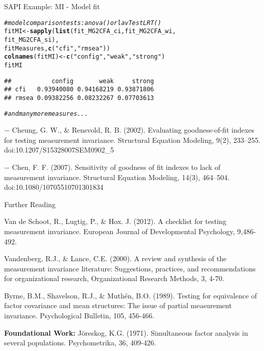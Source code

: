 \documentclass[10pt]{beamer}\usepackage[]{graphicx}\usepackage[]{xcolor}
\makeatletter
\newcommand{\hlsng}[1]{\textcolor[rgb]{0.192,0.494,0.8}{#1}}%
\newcommand{\hlcom}[1]{\textcolor[rgb]{0.678,0.584,0.686}{\textit{#1}}}%
\newcommand{\hldef}[1]{\textcolor[rgb]{0.345,0.345,0.345}{#1}}%
\newcommand{\hlkwb}[1]{\textcolor[rgb]{0.69,0.353,0.396}{#1}}%
\newcommand{\hlkwd}[1]{\textcolor[rgb]{0.737,0.353,0.396}{\textbf{#1}}}%
\newenvironment{kframe}{%
 \def\at@end@of@kframe{}%
 \ifinner\ifhmode%
  \def\at@end@of@kframe{\end{minipage}}%
  \begin{minipage}{\columnwidth}%
 \fi\fi%
 \def\FrameCommand##1{\hskip\@totalleftmargin \hskip-\fboxsep
 \colorbox{shadecolor}{##1}\hskip-\fboxsep
     \hskip-\linewidth \hskip-\@totalleftmargin \hskip\columnwidth}%
 \MakeFramed {\advance\hsize-\width
   \@totalleftmargin\z@ \linewidth\hsize
   \@setminipage}}%
 {\par\unskip\endMakeFramed%
 \at@end@of@kframe}
\newenvironment{knitrout}{}{} %
\makeatother
\begin{document}
\begin{frame}[fragile]{SAPI Example: MI - Model fit}

\begin{knitrout}
\color{fgcolor}\begin{kframe}
\begin{alltt}
\hlcom{# model comparison tests: anova() or lavTestLRT()}
\hldef{fitMI} \hlkwb{<-} \hlkwd{sapply}\hldef{(}\hlkwd{list}\hldef{(fit_MG2CFA_ci, fit_MG2CFA_wi,}
                     \hldef{fit_MG2CFA_si),}
                \hldef{fitMeasures,} \hlkwd{c}\hldef{(}\hlsng{"cfi"}\hldef{,} \hlsng{"rmsea"}\hldef{))}
\hlkwd{colnames}\hldef{(fitMI)} \hlkwb{<-} \hlkwd{c}\hldef{(}\hlsng{"config"}\hldef{,} \hlsng{"weak"}\hldef{,} \hlsng{"strong"}\hldef{)}
\hldef{fitMI}
\end{alltt}
\begin{verbatim}
##           config       weak     strong
## cfi   0.93940080 0.94168219 0.93871806
## rmsea 0.09382256 0.08232267 0.07703613
\end{verbatim}
\begin{alltt}
\hlcom{# and many more measures...}
\end{alltt}
\end{kframe}
\end{knitrout}

\footnotesize{
$-$ Cheung, G. W., \& Rensvold, R. B. (2002). Evaluating goodness-of-fit indexes for testing measurement invariance. Structural Equation Modeling, 9(2), 233–255. doi:10.1207/S15328007SEM0902\_5


$-$ Chen, F. F. (2007). Sensitivity of goodness of fit indexes to lack of measurement invariance. Structural Equation Modeling, 14(3), 464–504. doi:10.1080/10705510701301834
}
\end{frame}
%
\begin{frame}{Further Reading}

Van de Schoot, R., Lugtig, P., \& Hox. J. (2012). A checklist for testing measurement invariance. European Journal of Developmental Psychology, 9,486-492. 

\vspace{5mm}

Vandenberg, R.J., \& Lance, C.E. (2000). A review and synthesis of the measurement invariance literature: Suggestions, practices, and recommendations for organizational research, Organizational Research Methods, 3, 4-70. 

\vspace{5mm}

Byrne, B.M., Shavelson, R.J., \& Muthén, B.O. (1989). Testing for equivalence of factor covariance and mean structures: The issue of partial measurement invariance. Psychological Bulletin, 105, 456-466. 

\vspace{5mm}

\textbf{Foundational Work:} Jöreskog, K.G. (1971). Simultaneous factor analysis in several populations. Psychometrika, 36, 409-426.

\end{frame}
\end{document}
